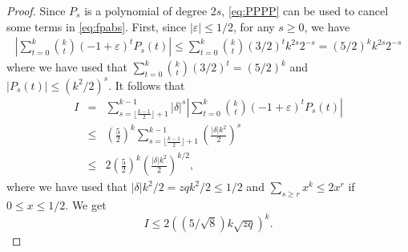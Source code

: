 \documentclass[11pt]{article}
\newcommand{\ABS}[1]{{{\left| #1 \right|}}} %
\newcommand{\PAR}[1]{{{\left(#1\right)}}} %
\newcommand{\1}{1\!\!{\sf I}}\newcommand{\IND}{\1}
\newcommand{\veps}{\varepsilon}
\begin{document}
\begin{proof}
Since $P_s$ is a polynomial of degree $2s$, \eqref{eq:PPPP} can be used to cancel some terms in \eqref{eq:fpabs}. First, since $| \veps | \leq 1/2$, for any $s\geq 0$, we have 
\begin{eqnarray*}
 \ABS{ \sum_{t=0} ^k  {k \choose t}  \PAR{ -  1  +  \veps}^t     P_s(t)} \leq    \sum_{t=0}^k {k \choose t} \PAR{ 3/2 }^t k^{2s}2 ^{-s}   =     (5/2) ^{k} k^{2s}2 ^{-s}
\end{eqnarray*}
where we have used that  $\sum_{t=0}^k {k \choose t} (3/2)^t = (5/2)^k$ and $\ABS{  P_s(t)} \leq (k^{2}/ 2) ^s$. It follows that \begin{eqnarray*}
I & = & \sum_{s =  \lfloor \frac{k -1}{2} \rfloor +1 }^{k-1}   | \delta| ^s  \ABS{  \sum_{t=0} ^k  {k \choose t} \PAR{ -1 +  \veps}^t   P_s(t)}\\
 & \leq & \PAR{\frac 5 2   }^k  \sum_{s =  \lfloor \frac{k -1}{2} \rfloor +1 }^{k-1}  \PAR{ \frac{| \delta|  k ^2}{2} }^s  \\
& \leq & 2   \PAR{\frac 5 2  }^k  \PAR{ \frac{| \delta|  k ^2}{2} }^{k/2},
\end{eqnarray*}
where we have used that $|\delta| k ^2 /2 = z q k ^2 / 2 \leq 1/2$ and $\sum_{s \geq r}  x^k \leq 2x^r$ if $0 \leq x \leq 1/2$. We get 
\begin{equation}\label{eq:boundI}
I \leq 2 \PAR{ ( 5 / \sqrt 8)   k \sqrt{z q}}^k.
\end{equation}



\end{proof}
\end{document}
